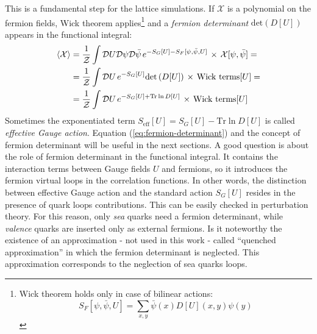 \documentclass[english, LaM, oneside, noexaminfo]{sapthesis}
\newcommand{\la}{\langle}
\newcommand{\ra}{\rangle}
\newcommand{\tr}{\text{Tr}}
\begin{document}
This is a fundamental step for the lattice simulations.
If $\mathcal{X}$ is a polynomial on the fermion fields, Wick theorem applies\footnote{Wick theorem holds only in case of bilinear actions: $$S_F[\psi,\bar\psi ,U] = \sum_{x,y}\bar \psi (x) D[U](x,y) \psi (y)$$ } and a {\it fermion determinant} $\text{det}\left(D[U]\right)$ appears in the functional integral:
\begin{equation}\label{eq:fermion-determinant}
    \begin{aligned}
        \la \mathcal{X} \ra
        & = \frac{1}{\mathcal Z} \int \mathcal{D}U \mathcal{D}\psi \mathcal{D}\bar\psi \hspace*{0.5mm} e^{-S_G[U]-S_F[\psi,\bar\psi ,U]} \hspace*{0.5mm} \times \hspace*{0.5mm} \mathcal{X} [\psi,\bar\psi] = \\
        & = \frac{1}{\mathcal Z} \int \mathcal{D}U \hspace*{0.5mm} e^{-S_G[U]} \text{det}\left(D[U]\right) \hspace*{0.5mm} \times \hspace*{0.5mm} \text{Wick terms}[U] = \\
        & = \frac{1}{\mathcal Z} \int \mathcal{D}U \hspace*{0.5mm} e^{-S_G[U] + \tr \ln D[U]} \hspace*{0.5mm} \times \hspace*{0.5mm} \text{Wick terms}[U]
    \end{aligned}
\end{equation}
Sometimes the exponentiated term $S_\text{eff}[U] = S_G[U] - \tr \ln D[U]$ is called {\it effective Gauge action}.
Equation (\ref{eq:fermion-determinant}) and the concept of fermion determinant will be useful in the next sections.
A good question is about the role of fermion determinant in the functional integral.
It contains the interaction terms between Gauge fields $U$ and fermions, so it introduces the fermion virtual loops in the correlation functions.
In other words, the distinction between effective Gauge action and the standard action $S_G[U]$ resides in the presence of quark loops contributions.
This can be easily checked in perturbation theory.
For this reason, only {\it sea} quarks need a fermion determinant, while {\it valence} quarks are inserted only as external fermions.
Is it noteworthy the existence of an approximation - not used in this work - called ``quenched approximation'' in which the fermion determinant is neglected.
This approximation corresponds to the neglection of sea quarks loops.
\end{document}
